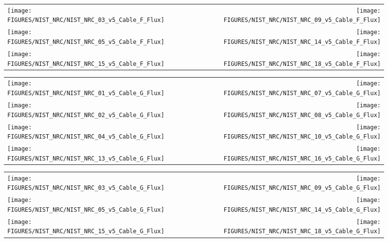 \begin{figure}[p]
\begin{tabular*}{\textwidth}{l@{\extracolsep{\fill}}r}
\texttt{[image: FIGURES/NIST\_NRC/NIST\_NRC\_03\_v5\_Cable\_F\_Flux]} &
\texttt{[image: FIGURES/NIST\_NRC/NIST\_NRC\_09\_v5\_Cable\_F\_Flux]} \\
\texttt{[image: FIGURES/NIST\_NRC/NIST\_NRC\_05\_v5\_Cable\_F\_Flux]} &
\texttt{[image: FIGURES/NIST\_NRC/NIST\_NRC\_14\_v5\_Cable\_F\_Flux]} \\
\texttt{[image: FIGURES/NIST\_NRC/NIST\_NRC\_15\_v5\_Cable\_F\_Flux]} &
\texttt{[image: FIGURES/NIST\_NRC/NIST\_NRC\_18\_v5\_Cable\_F\_Flux]}
\end{tabular*}
\label{NIST_NRC_Cable_F_Flux_Open}
\end{figure}

\begin{figure}[p]
\begin{tabular*}{\textwidth}{l@{\extracolsep{\fill}}r}
\texttt{[image: FIGURES/NIST\_NRC/NIST\_NRC\_01\_v5\_Cable\_G\_Flux]} &
\texttt{[image: FIGURES/NIST\_NRC/NIST\_NRC\_07\_v5\_Cable\_G\_Flux]} \\
\texttt{[image: FIGURES/NIST\_NRC/NIST\_NRC\_02\_v5\_Cable\_G\_Flux]} &
\texttt{[image: FIGURES/NIST\_NRC/NIST\_NRC\_08\_v5\_Cable\_G\_Flux]} \\
\texttt{[image: FIGURES/NIST\_NRC/NIST\_NRC\_04\_v5\_Cable\_G\_Flux]} &
\texttt{[image: FIGURES/NIST\_NRC/NIST\_NRC\_10\_v5\_Cable\_G\_Flux]} \\
\texttt{[image: FIGURES/NIST\_NRC/NIST\_NRC\_13\_v5\_Cable\_G\_Flux]} &
\texttt{[image: FIGURES/NIST\_NRC/NIST\_NRC\_16\_v5\_Cable\_G\_Flux]}
\end{tabular*}
\label{NIST_NRC_Cable_G_Flux_Closed}
\end{figure}

\begin{figure}[p]
\begin{tabular*}{\textwidth}{l@{\extracolsep{\fill}}r}
\texttt{[image: FIGURES/NIST\_NRC/NIST\_NRC\_03\_v5\_Cable\_G\_Flux]} &
\texttt{[image: FIGURES/NIST\_NRC/NIST\_NRC\_09\_v5\_Cable\_G\_Flux]} \\
\texttt{[image: FIGURES/NIST\_NRC/NIST\_NRC\_05\_v5\_Cable\_G\_Flux]} &
\texttt{[image: FIGURES/NIST\_NRC/NIST\_NRC\_14\_v5\_Cable\_G\_Flux]} \\
\texttt{[image: FIGURES/NIST\_NRC/NIST\_NRC\_15\_v5\_Cable\_G\_Flux]} &
\texttt{[image: FIGURES/NIST\_NRC/NIST\_NRC\_18\_v5\_Cable\_G\_Flux]}
\end{tabular*}
\label{NIST_NRC_Cable_G_Flux_Open}
\end{figure}




